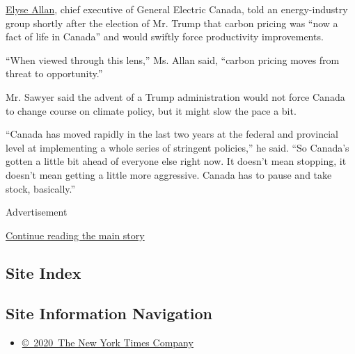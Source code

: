 \href{http://www.ge.com/ca/en/about-us/leadership/elyse-allan-president-and-ceo}{Elyse
Allan}, chief executive of General Electric Canada, told an
energy-industry group shortly after the election of Mr. Trump that
carbon pricing was ``now a fact of life in Canada'' and would swiftly
force productivity improvements.

``When viewed through this lens,'' Ms. Allan said, ``carbon pricing
moves from threat to opportunity.''

Mr. Sawyer said the advent of a Trump administration would not force
Canada to change course on climate policy, but it might slow the pace a
bit.

``Canada has moved rapidly in the last two years at the federal and
provincial level at implementing a whole series of stringent policies,''
he said. ``So Canada's gotten a little bit ahead of everyone else right
now. It doesn't mean stopping, it doesn't mean getting a little more
aggressive. Canada has to pause and take stock, basically.''

Advertisement

\protect\hyperlink{after-bottom}{Continue reading the main story}

\hypertarget{site-index}{%
\subsection{Site Index}\label{site-index}}

\hypertarget{site-information-navigation}{%
\subsection{Site Information
Navigation}\label{site-information-navigation}}

\begin{itemize}
\tightlist
\item
  \href{https://help.nytimes.com/hc/en-us/articles/115014792127-Copyright-notice}{©~2020~The
  New York Times Company}
\end{itemize}

